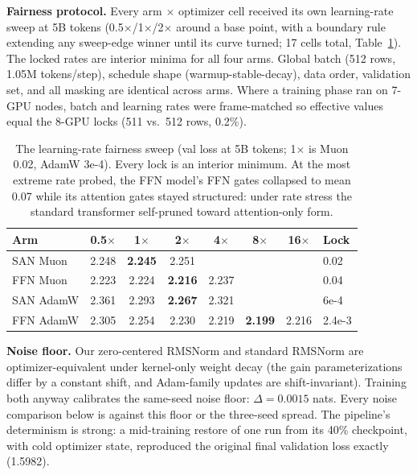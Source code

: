 \documentclass[letterpaper]{article} %
\begin{document}


\textbf{Fairness protocol.} Every arm $\times$ optimizer cell received its
own learning-rate sweep at 5B tokens (0.5$\times$/1$\times$/2$\times$
around a base point, with a boundary rule extending any sweep-edge winner
until its curve turned; 17 cells total, Table~\ref{tab:sweep}). The
locked rates are interior minima for all four arms. Global batch (512
rows, 1.05M tokens/step), schedule shape (warmup-stable-decay), data
order, validation set, and all masking are identical across arms. Where a
training phase ran on 7-GPU nodes, batch and learning rates were
frame-matched so effective values equal the 8-GPU locks (511 vs.\ 512
rows, 0.2\%).

\begin{table}[tb]\centering\footnotesize
\setlength{\tabcolsep}{3pt}
\begin{tabular}{@{}lccccccl@{}}
\toprule
Arm & 0.5$\times$ & 1$\times$ & 2$\times$ & 4$\times$ & 8$\times$ &
16$\times$ & Lock \\
\midrule
SAN Muon & 2.248 & \textbf{2.245} & 2.251 & & & & 0.02 \\
FFN Muon & 2.223 & 2.224 & \textbf{2.216} & 2.237 & & & 0.04 \\
SAN AdamW & 2.361 & 2.293 & \textbf{2.267} & 2.321 & & & 6e-4 \\
FFN AdamW & 2.305 & 2.254 & 2.230 & 2.219 & \textbf{2.199} & 2.216 &
2.4e-3 \\
\bottomrule
\end{tabular}
\caption{The learning-rate fairness sweep (val loss at 5B tokens;
1$\times$ is Muon 0.02, AdamW 3e-4). Every lock is an interior minimum.
At the most extreme rate probed, the FFN model's FFN gates collapsed to
mean 0.07 while its attention gates stayed structured: under rate stress
the standard transformer self-pruned toward attention-only form.}
\label{tab:sweep}
\end{table}

\textbf{Noise floor.} Our zero-centered RMSNorm and standard RMSNorm are
optimizer-equivalent under kernel-only weight decay (the gain
parameterizations differ by a constant shift, and Adam-family updates are
shift-invariant). Training both anyway calibrates the same-seed noise
floor: $\Delta = 0.0015$ nats. Every noise comparison below is against
this floor or the three-seed spread. The pipeline's determinism is
strong: a mid-training restore of one run from its 40\% checkpoint, with
cold optimizer state, reproduced the original final validation loss
exactly (1.5982).
\end{document}
